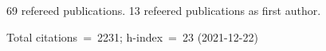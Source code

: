 69 refereed publications. 13 refeered publications as first author.

Total citations~=~2231; h-index~=~23 (2021-12-22)